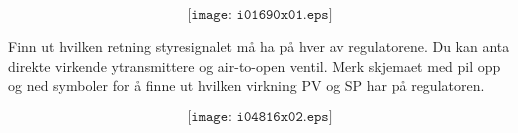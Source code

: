 $$\texttt{[image: i01690x01.eps]}$$

Finn ut hvilken retning styresignalet må ha på hver av regulatorene. Du kan anta direkte virkende ytransmittere og air-to-open ventil. Merk skjemaet med pil opp og ned symboler for å finne ut hvilken virkning PV og SP har på regulatoren. \\









$$\texttt{[image: i04816x02.eps]}$$







